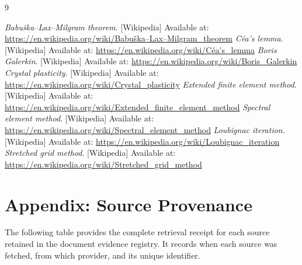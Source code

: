 \documentclass[12pt, a4paper]{article}
\begin{document}
\begin{thebibliography}{9}
\raggedright
   \textit{Babuška–Lax–Milgram theorem}. [Wikipedia] Available at: \url{https://en.wikipedia.org/wiki/Babuška–Lax–Milgram_theorem}
   \textit{Céa's lemma}. [Wikipedia] Available at: \url{https://en.wikipedia.org/wiki/Céa's_lemma}
   \textit{Boris Galerkin}. [Wikipedia] Available at: \url{https://en.wikipedia.org/wiki/Boris_Galerkin}
   \textit{Crystal plasticity}. [Wikipedia] Available at: \url{https://en.wikipedia.org/wiki/Crystal_plasticity}
   \textit{Extended finite element method}. [Wikipedia] Available at: \url{https://en.wikipedia.org/wiki/Extended_finite_element_method}
   \textit{Spectral element method}. [Wikipedia] Available at: \url{https://en.wikipedia.org/wiki/Spectral_element_method}
   \textit{Loubignac iteration}. [Wikipedia] Available at: \url{https://en.wikipedia.org/wiki/Loubignac_iteration}
   \textit{Stretched grid method}. [Wikipedia] Available at: \url{https://en.wikipedia.org/wiki/Stretched_grid_method}
\end{thebibliography}

\newpage
\section*{Appendix: Source Provenance}
\small
The following table provides the complete retrieval receipt for each source retained in the document evidence registry.
It records when each source was fetched, from which provider, and its unique identifier.
\vspace{1em}
\end{document}
